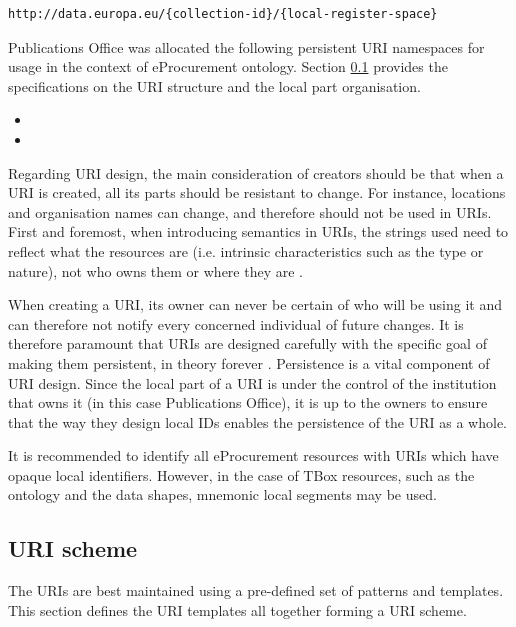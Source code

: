 \begin{lstlisting}[language=XML,frame=none, basicstyle=\footnotesize\ttfamily,breaklines=true]
http://data.europa.eu/{collection-id}/{local-register-space}
\end{lstlisting}
	
	Publications Office was allocated the following persistent URI namespaces for usage in the context of eProcurement ontology. Section \ref{sec:uri-scheme} provides the specifications on the URI structure and the local part organisation. 

	\begin{itemize}
		\item {}
		\item {}
	\end{itemize}
	
	Regarding URI design, the main consideration of creators should be that when a URI is created, all its parts should be resistant to change. For instance, locations and organisation names can change, and therefore should not be used in URIs. First and foremost, when introducing semantics in URIs, the strings used need to reflect what	the resources are (i.e. intrinsic characteristics such as the type or nature), not who owns them or where they are \cite{d4.02.02-2018}. 

	When creating a URI, its owner can never be certain of who will be using it and can	therefore not notify every concerned individual of future changes. It is therefore	paramount that URIs are designed carefully with the specific goal of making them persistent, in theory forever \cite{burners1998cool}. Persistence is a vital component of URI design.	Since the local part of a URI is under the control of the institution that owns it (in this case Publications Office), it is up to the owners to ensure that the way they design local IDs enables the persistence of the URI as a whole.
	
	It is recommended to identify all eProcurement resources with URIs which have opaque local identifiers. However, in the case of TBox resources, such as the ontology and the data shapes, mnemonic local segments may be used.
		
	\subsection{URI scheme}
	\label{sec:uri-scheme}
	 

	The URIs are best maintained using a pre-defined set of patterns and templates. This section defines the URI templates all together forming a URI scheme. 
	
